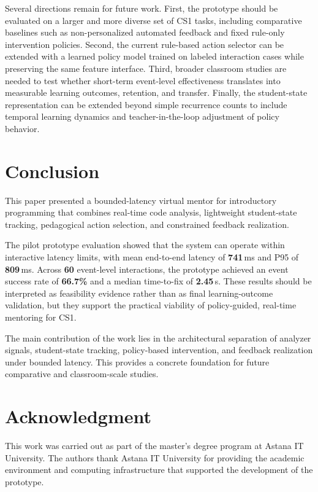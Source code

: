 \documentclass[conference]{IEEEtran}
\begin{document}
Several directions remain for future work. First, the prototype should be evaluated on a larger and more diverse set of CS1 tasks, including comparative baselines such as non-personalized automated feedback and fixed rule-only intervention policies. Second, the current rule-based action selector can be extended with a learned policy model trained on labeled interaction cases while preserving the same feature interface. Third, broader classroom studies are needed to test whether short-term event-level effectiveness translates into measurable learning outcomes, retention, and transfer. Finally, the student-state representation can be extended beyond simple recurrence counts to include temporal learning dynamics and teacher-in-the-loop adjustment of policy behavior.

\section{Conclusion}

This paper presented a bounded-latency virtual mentor for introductory programming that combines real-time code analysis, lightweight student-state tracking, pedagogical action selection, and constrained feedback realization.

The pilot prototype evaluation showed that the system can operate within interactive latency limits, with mean end-to-end latency of \textbf{741}\,ms and P95 of \textbf{809}\,ms. Across \textbf{60} event-level interactions, the prototype achieved an event success rate of \textbf{66.7\%} and a median time-to-fix of \textbf{2.45}\,s. These results should be interpreted as feasibility evidence rather than as final learning-outcome validation, but they support the practical viability of policy-guided, real-time mentoring for CS1.

The main contribution of the work lies in the architectural separation of analyzer signals, student-state tracking, policy-based intervention, and feedback realization under bounded latency. This provides a concrete foundation for future comparative and classroom-scale studies.

\section*{Acknowledgment}

This work was carried out as part of the master’s degree program at Astana IT University. The authors thank Astana IT University for providing the academic environment and computing infrastructure that supported the development of the prototype.

\nocite{Francisco2022}
\nocite{Chrysafiadi2022}
\nocite{pankiewicz2023largelanguagemodelsgpt}
\nocite{AutomatedAssessmentToolsForGrading2022}
\nocite{AdaptiveImmediateFeedbackforBlockBasedProgramming}
\nocite{FeedbackSystemSupportingStudents2022}
\nocite{EvaluationofLLMtoolsforfeedbackgeneration}
\nocite{AutomatingHumanTutorStyleProgrammingFeedback}
\nocite{AITutoringinSDEducation}
\nocite{AutomatedGradingandFeedbackToolsforProgrammingEducationSystematicReview}


\end{document}
